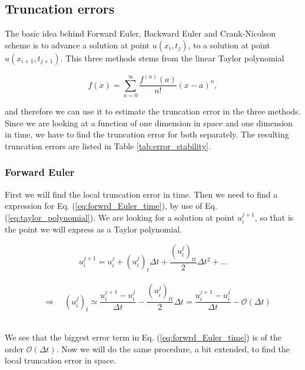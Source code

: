 \documentclass[12pt]{article}
\begin{document}
\begin{flushleft}
\subsection{Truncation errors}
The basic idea behind Forward Euler, Backward Euler and Crank-Nicolson scheme is to advance a solution at point $u(x_i,t_j)$, to a solution at point $u(x_{i+1},t_{j+1})$. This three methods stems from the linear Taylor polynomial

\vspace{5mm}
\begin{equation}\label{eq:taylor_polynomial}
f(x) = \sum\limits_{n=0}^{\infty}\frac{f^{(n)}(a)}{n!}(x-a)^n,
\end{equation}
\vspace{5mm} 

and therefore we can use it to estimate the truncation error in the three methods. Since we are looking at a function of one dimension in space and one dimension in time, we have to find the truncation error for both separately. The resulting truncation errors are listed in Table \ref{tab:error_stability}.
\subsubsection{Forward Euler}
First we will find the local truncation error in time. Then we need to find a expression for Eq. (\ref{eq:forwrd_Euler_time}), by use of Eq. (\ref{eq:taylor_polynomial}). We are looking for a solution at point $u_i^{j+1}$, so that is the point we will express as a Taylor polynomial.

\vspace{5mm}
$$u_i^{j+1} = u_i^j + (u_i^j)_t\Delta t + \frac{(u_i^j)_{tt}}{2}\Delta t^2 + \dots$$\\
\vspace{5mm} 
$$\quad\Rightarrow\quad (u_i^j)_t \simeq \frac{u_i^{j+1}-u_i^j}{\Delta t} - \frac{(u_i^j)_{tt}}{2}\Delta t = \frac{u_i^{j+1}-u_i^j}{\Delta t} - \mathcal{O}(\Delta t)$$\\
\vspace{5mm}

We see that the biggest error term in Eq. (\ref{eq:forwrd_Euler_time}) is of the order $\mathcal{O}(\Delta t)$. Now we will do the same procedure, a bit extended, to find the local truncation error in space.


\end{flushleft}
\end{document}
